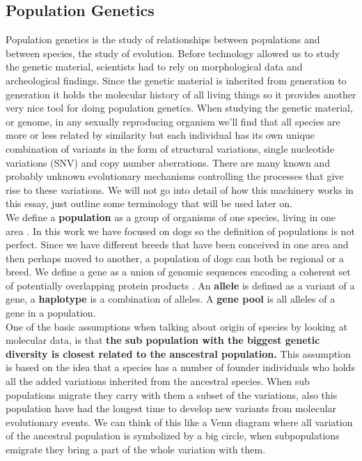 \subsection{Population Genetics}

Population genetics is the study of relationships between populations and between species, the study of evolution. Before technology allowed us to study the genetic material, scientists had to rely on morphological data and archeological findings. Since the genetic material is inherited from generation to generation it holds the molecular history of all living things so it provides another very nice tool for doing population genetics. When studying the genetic material, or genome, in any sexually reproducing organism we'll find that all species are more or less related by similarity but each individual has its own unique combination of variants in the form of structural variations, single nucleotide variations (SNV) and copy number aberrations. There are many known and probably unknown evolutionary mechanisms controlling the processes that give rise to these variations. We will not go into detail of how this machinery works in this essay, just outline some terminology that will be used later on.\\

We define a \textbf{population} as a group of organisms of one species, living in one area \cite{fundamental}. In this work we have focused on dogs so the definition of populations is not perfect. Since we have different breeds that have been conceived in one area and then perhaps moved to another, a population of dogs can both be regional or a breed. We define a gene as a union of genomic sequences encoding a coherent set of potentially overlapping protein products \cite{gerstein07}. An \textbf{allele} is defined as a variant of a gene, a \textbf{haplotype} is a combination of alleles. A \textbf{gene pool} is all alleles of a gene in a population.\\


One of the basic assumptions when talking about origin of species by looking at molecular data, is that \textbf{the sub population with the biggest genetic diversity is closest related to the anscestral population.} This assumption is based on the idea that a species has a number of founder individuals who holds all the added variations inherited from the ancestral species. When sub populations migrate they carry with them a subset of the variations, also this population have had the longest time to develop new variants from molecular evolutionary events. We can think of this like a Venn diagram where all variation of the ancestral population is symbolized by a big circle, when subpopulations emigrate they bring a part of the whole variation with them.\\

